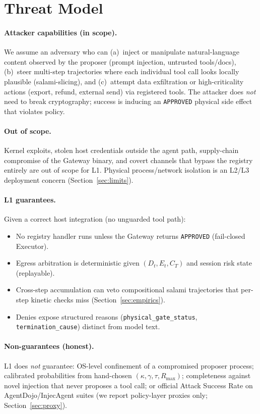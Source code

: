 \documentclass{article}
\begin{document}
\section{Threat Model}
\label{sec:threat}

\paragraph{Attacker capabilities (in scope).}
We assume an adversary who can (a)~inject or manipulate natural-language
content observed by the proposer (prompt injection, untrusted tools/docs),
(b)~steer multi-step trajectories where each individual tool call looks
locally plausible (salami-slicing), and (c)~attempt data exfiltration or
high-criticality actions (export, refund, external send) via registered
tools. The attacker does \emph{not} need to break cryptography; success is
inducing an \texttt{APPROVED} physical side effect that violates policy.

\paragraph{Out of scope.}
Kernel exploits, stolen host credentials outside the agent path, supply-chain
compromise of the Gateway binary, and covert channels that bypass the
registry entirely are out of scope for L1. Physical process/network isolation
is an L2/L3 deployment concern (Section~\ref{sec:limits}).

\paragraph{L1 guarantees.}
Given a correct host integration (no unguarded tool path):
\begin{itemize}
  \item No registry handler runs unless the Gateway returns
        \texttt{APPROVED} (fail-closed Executor).
  \item Egress arbitration is deterministic given $(D_t,E_t,C_T)$ and session
        risk state (replayable).
  \item Cross-step accumulation can veto compositional salami trajectories
        that per-step kinetic checks miss (Section~\ref{sec:empirics}).
  \item Denies expose structured reasons
        (\texttt{physical\_gate\_status}, \texttt{termination\_cause})
        distinct from model text.
\end{itemize}

\paragraph{Non-guarantees (honest).}
L1 does \emph{not} guarantee: OS-level confinement of a compromised proposer
process; calibrated probabilities from hand-chosen $(\kappa,\gamma,\tau,R_{\max})$;
completeness against novel injection that never proposes a tool call; or
official Attack Success Rate on AgentDojo/InjecAgent suites (we report
policy-layer proxies only; Section~\ref{sec:proxy}).
\end{document}
